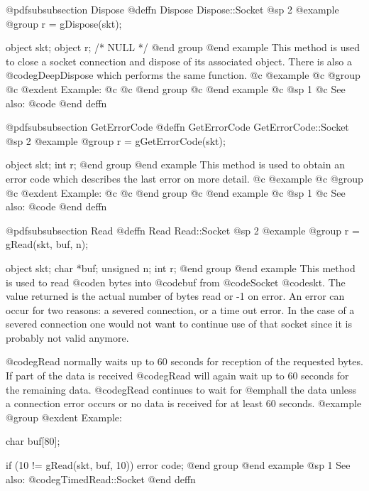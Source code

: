 @pdfsubsubsection {Dispose}
@deffn {Dispose} Dispose::Socket
@sp 2
@example
@group
r = gDispose(skt);

object  skt;
object  r;     /*  NULL  */
@end group
@end example
This method is used to close a socket connection and dispose of its
associated object.  There is also a @code{gDeepDispose} which performs the
same function.
@c @example
@c @group
@c @exdent Example:
@c 
@c @end group
@c @end example
@c @sp 1
@c See also:  @code{}
@end deffn















@pdfsubsubsection {GetErrorCode}
@deffn {GetErrorCode} GetErrorCode::Socket
@sp 2
@example
@group
r = gGetErrorCode(skt);

object  skt;
int     r;
@end group
@end example
This method is used to obtain an error code which describes the last
error on more detail.
@c @example
@c @group
@c @exdent Example:
@c 
@c @end group
@c @end example
@c @sp 1
@c See also:  @code{}
@end deffn












@pdfsubsubsection {Read}
@deffn {Read} Read::Socket
@sp 2
@example
@group
r = gRead(skt, buf, n);

object   skt;
char     *buf;
unsigned n;
int      r;
@end group
@end example
This method is used to read @code{n} bytes into @code{buf} from
@code{Socket} @code{skt}.  The value returned is the actual number
of bytes read or -1 on error.  An error can occur for two reasons:
a severed connection, or a time out error.  In the case of a severed
connection one would not want to continue use of that socket since
it is probably not valid anymore.

@code{gRead} normally waits up to 60 seconds for reception of the
requested bytes.  If part of the data is received @code{gRead}
will again wait up to 60 seconds for the remaining data.  @code{gRead}
continues to wait for @emph{all} the data unless a connection error
occurs or no data is received for at least 60 seconds.
@example
@group
@exdent Example:
 
char    buf[80];

if (10 != gRead(skt, buf, 10))
        error code;
@end group
@end example
@sp 1
See also:  @code{gTimedRead::Socket}
@end deffn
















